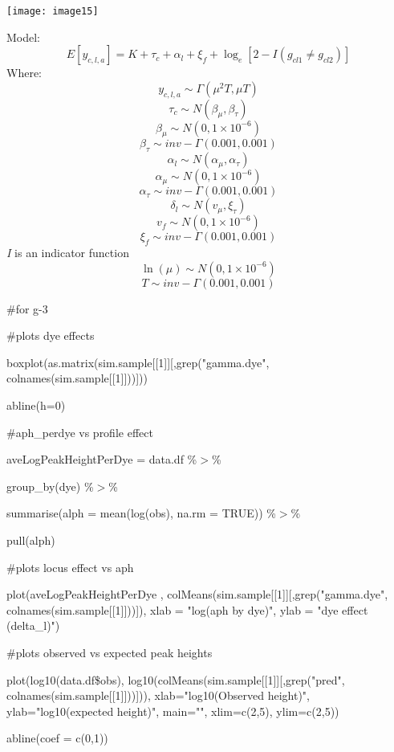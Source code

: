 \documentclass{article} %
\begin{document}
\noindent \texttt{[image: image15]}

\noindent 

\noindent Model:
\[E\left[y_{c,l,a} \right]=K+\tau _{c} +\alpha _{l} +\xi _{f} +\log _{e} \left[2-I\left(g_{cl1} \ne g_{cl2} \right)\right]\] 
Where:
\[y_{c,l,a} \sim \Gamma \left(\mu ^{2} T,\mu T\right)\] 
\[\tau _{c} \sim N\left(\beta _{\mu } ,\beta _{\tau } \right)\] 
\[\beta _{\mu } \sim N(0,1\times 10^{-6} )\] 
\[\beta _{\tau } \sim inv-\Gamma (0.001,0.001)\] 
\[\alpha _{l} \sim N\left(\alpha _{\mu } ,\alpha _{\tau } \right)\] 
\[\alpha _{\mu } \sim N(0,1\times 10^{-6} )\] 
\[\alpha _{\tau } \sim inv-\Gamma (0.001,0.001)\] 
\[\delta _{l} \sim N\left(v_{\mu } ,\xi _{\tau } \right)\] 
\[v_{f} \sim N(0,1\times 10^{-6} )\] 
\[\xi _{f} \sim inv-\Gamma (0.001,0.001)\] 
\textit{I} is an indicator function
\[\ln (\mu )\sim N(0,1\times 10^{-6} )\] 
\[T\sim inv-\Gamma (0.001,0.001)\] 


\noindent \#for g-3

\noindent \#plots dye effects

\noindent boxplot(as.matrix(sim.sample[[1]][,grep("gamma.dye", colnames(sim.sample[[1]]))]))

\noindent abline(h=0)

\noindent 

\noindent 

\noindent \#aph\_perdye vs profile effect

\noindent aveLogPeakHeightPerDye = data.df \%$\mathrm{>}$\%

\noindent       group\_by(dye) \%$\mathrm{>}$\%

\noindent       summarise(alph = mean(log(obs), na.rm = TRUE)) \%$\mathrm{>}$\%

\noindent       pull(alph)

\noindent 

\noindent \#plots locus effect vs aph

\noindent plot(aveLogPeakHeightPerDye , colMeans(sim.sample[[1]][,grep("gamma.dye", colnames(sim.sample[[1]]))]), xlab = "log(aph by dye)", ylab = "dye effect (delta\_l)")

\noindent \#plots observed vs expected peak heights

\noindent plot(log10(data.df\$obs), log10(colMeans(sim.sample[[1]][,grep("pred", colnames(sim.sample[[1]]))])), xlab="log10(Observed height)", ylab="log10(expected height)", main="", xlim=c(2,5), ylim=c(2,5))

\noindent abline(coef = c(0,1))
\end{document}
